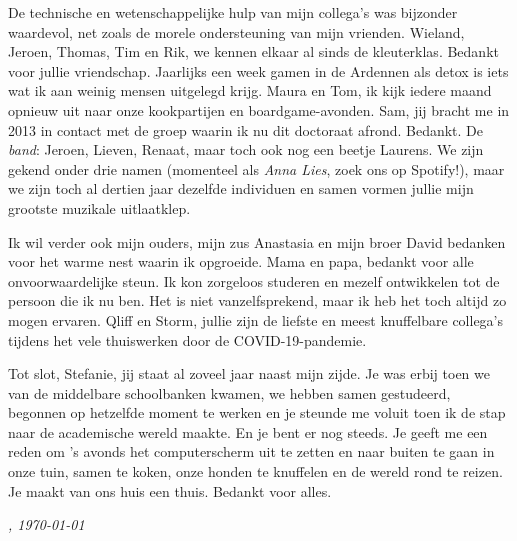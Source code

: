\documentclass[\home/main.tex]{subfiles}
\begin{document}
De technische en wetenschappelijke hulp van mijn collega's was bijzonder waardevol, net zoals de morele ondersteuning van mijn vrienden.
Wieland, Jeroen, Thomas, Tim en Rik, we kennen elkaar al sinds de kleuterklas. Bedankt voor jullie vriendschap. Jaarlijks een week gamen in de Ardennen als detox is iets wat ik aan weinig mensen uitgelegd krijg.
Maura en Tom, ik kijk iedere maand opnieuw uit naar onze kookpartijen en boardgame-avonden.
Sam, jij bracht me in 2013 in contact met de groep waarin ik nu dit doctoraat afrond. Bedankt.
De \textit{band}: Jeroen, Lieven, Renaat, maar toch ook nog een beetje Laurens. We zijn gekend onder drie namen (momenteel als \textit{Anna Lies}, zoek ons op Spotify!), maar we zijn toch al dertien jaar dezelfde individuen en samen vormen jullie mijn grootste muzikale uitlaatklep.
 
Ik wil verder ook mijn ouders, mijn zus Anastasia en mijn broer David bedanken voor het warme nest waarin ik opgroeide.
Mama en papa, bedankt voor alle onvoorwaardelijke steun. Ik kon zorgeloos studeren en mezelf ontwikkelen tot de persoon die ik nu ben. Het is niet vanzelfsprekend, maar ik heb het toch altijd zo mogen ervaren.
Qliff en Storm, jullie zijn de liefste en meest knuffelbare collega's tijdens het vele thuiswerken door de COVID-19-pandemie.
 
Tot slot, Stefanie, jij staat al zoveel jaar naast mijn zijde. Je was erbij toen we van de middelbare schoolbanken kwamen, we hebben samen gestudeerd, begonnen op hetzelfde moment te werken en je steunde me voluit toen ik de stap naar de academische wereld maakte. En je bent er nog steeds. Je geeft me een reden om 's avonds het computerscherm uit te zetten en naar buiten te gaan in onze tuin, samen te koken, onze honden te knuffelen en de wereld rond te reizen. Je maakt van ons huis een thuis. Bedankt voor alles.



\vspace{1cm}

\begin{flushright}
    \textit{\theauthor, \today}
\end{flushright}
\end{document}
